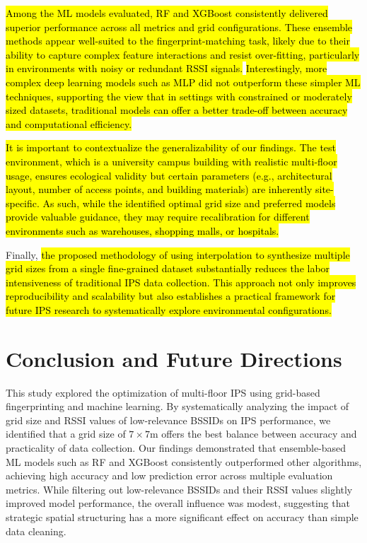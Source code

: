 \documentclass[runningheads]{llncs}
\newcommand{\hlgreen}[1]{\sethlcolor{lightgreen}\hl{#1}}
\newcommand{\hlred}[1]{\sethlcolor{lightred}\hl{#1}}
\begin{document}
\hlgreen{Among the ML models evaluated, RF and XGBoost consistently delivered superior performance across all metrics and grid configurations. These ensemble methods appear well-suited to the fingerprint-matching task, likely due to their ability to capture complex feature interactions and resist over-fitting, particularly in environments with noisy or redundant RSSI signals.} \hlred{Interestingly, more complex deep learning models such as MLP did not outperform these simpler ML techniques, supporting the view that in settings with constrained or moderately sized datasets, traditional models can offer a better trade-off between accuracy and computational efficiency.}

\hlred{It is important to contextualize the generalizability of our findings. The test environment, which is a university campus building with realistic multi-floor usage, ensures ecological validity but certain parameters (e.g., architectural layout, number of access points, and building materials) are inherently site-specific. As such, while the identified optimal grid size and preferred models provide valuable guidance, they may require recalibration for different environments such as warehouses, shopping malls, or hospitals.}

Finally, \hlgreen{the proposed methodology of using interpolation to synthesize multiple grid sizes from a single fine-grained dataset substantially reduces the labor intensiveness of traditional IPS data collection. This approach not only improves reproducibility and scalability but also establishes a practical framework for future IPS research to systematically explore environmental configurations.}

\section{Conclusion and Future Directions}\label{sec:conclusion}

This study explored the optimization of multi-floor IPS using grid-based fingerprinting and machine learning. By systematically analyzing the impact of grid size and RSSI values of low-relevance BSSIDs on IPS performance, we identified that a grid size of $7\times7$m offers the best balance between accuracy and practicality of data collection. Our findings demonstrated that ensemble-based ML models such as RF and XGBoost consistently outperformed other algorithms, achieving high accuracy and low prediction error across multiple evaluation metrics. While filtering out low-relevance BSSIDs and their RSSI values slightly improved model performance, the overall influence was modest, suggesting that strategic spatial structuring has a more significant effect on accuracy than simple data cleaning.
\end{document}
